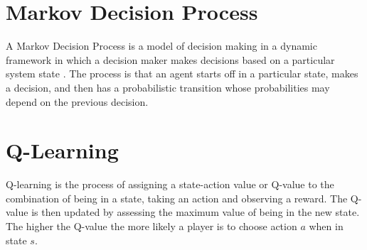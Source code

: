 \documentclass[a0,landscape]{a0poster}
\begin{document}
\begin{multicols}{2}
\color{SteelBlue}
\section*{Markov Decision Process}
A Markov Decision Process is a model of decision making in a dynamic framework in which a decision maker makes decisions based on a particular system state \cite{puterman2009markov}.
The process is that an agent starts off in a particular state, makes a decision, and then has a probabilistic transition whose probabilities may depend on the previous decision.

\section*{Q-Learning}
Q-learning is the process of assigning a state-action value or Q-value to the combination of being in a state, taking an action and observing a reward.
The Q-value is then updated by assessing the maximum value of being in the new state.
The higher the Q-value the more likely a player is to choose action $a$ when in state $s$.

\end{multicols}
\end{document}

